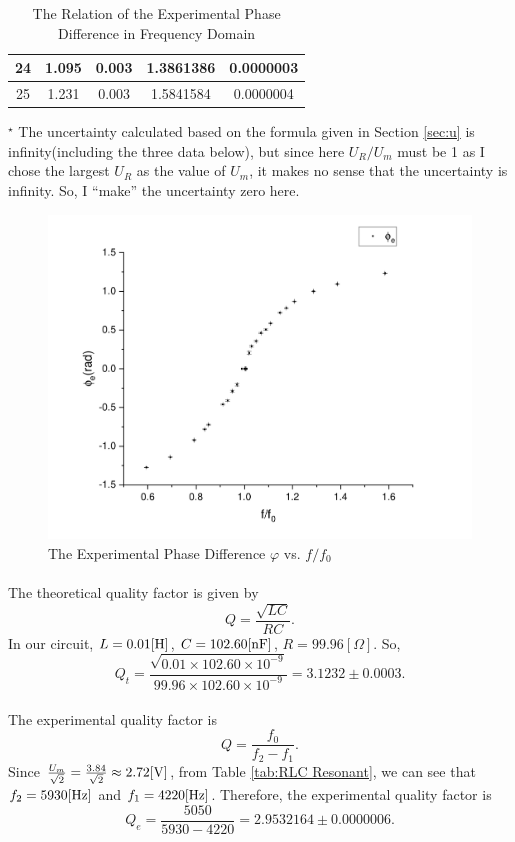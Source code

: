 \documentclass{my_template}
\renewcommand{\phi}{\varphi}
\begin{document}
\begin{table}[H]
\begin{center}
\begin{tabular}{|c|c|c|c|c|}
                24&1.095&0.003&1.3861386&0.0000003\\\hline
                25&1.231&0.003&1.5841584&0.0000004\\\hline
            \end{tabular}
        \end{center}
        \caption{The Relation of the Experimental Phase Difference in Frequency Domain}
        $^\star$ The uncertainty calculated based on the formula given in Section \ref{sec:u} is infinity(including the three data below), but since here $U_R/U_m$ must be 1 as I chose the largest $U_R$ as the value of $U_m$, it makes no sense that the uncertainty is infinity. So, I ``make'' the uncertainty zero here.         
        \label{tab:phie}
    \end{table}
    \begin{figure}[H]
        \centering
        \includegraphics[width=\textwidth]{fig/phie.pdf}
        \caption{The Experimental Phase Difference $\phi$ vs. $f/f_0$}
        \label{fig:phie}
    \end{figure}
    \paragraph{}The theoretical quality factor is given by $$Q=\frac{\sqrt{LC}}{RC}.$$ In our circuit, $L=0.01[\rm H]$, $C=102.60[\rm nF]$, $R=99.96[\Omega]$. So, $$Q_t=\frac{\sqrt{0.01\times 102.60\times 10^{-9}}}{99.96\times 102.60\times 10^{-9}}=3.1232\pm 0.0003.$$
    \vspace{-5mm} 
    \paragraph{}The experimental quality factor is $$Q=\frac{f_0}{f_2-f_1}.$$ Since $\frac{U_m}{\sqrt{2}}=\frac{3.84}{\sqrt2}\approx 2.72[\rm V]$, from Table \ref{tab:RLC Resonant}, we can see that $f_2=5930[\rm Hz]$ and $f_1=4220[\rm Hz]$. Therefore, the experimental quality factor is $$Q_e=\frac{5050}{5930-4220}=2.9532164\pm 0.0000006.$$
\end{document}
